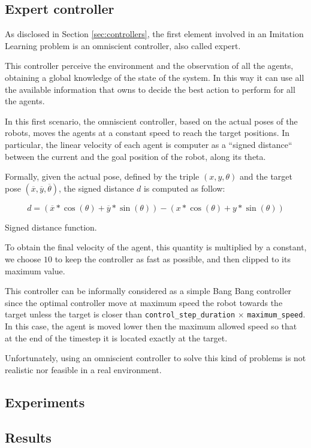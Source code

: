\subsection{Expert controller}
\label{subsec:omniscient}

As disclosed in Section \ref{sec:controllers}, the first element involved in an 
Imitation Learning problem is an omniscient controller, also called expert.

This controller perceive the environment and the observation of all the agents, 
obtaining a global knowledge of the state of the system. In this way it can use all 
the available information that owns to decide the best action to perform for all 
the agents. 

In this first scenario, the omniscient controller, based on the actual poses of the 
robots, moves the agents at a constant speed to reach the target positions. In 
particular, the linear velocity of each agent is computer as a ``signed distance`` 
between the current and the goal position of the robot, along its theta. 

Formally, given the actual pose, defined by the triple $(x, y, \theta)$ and the 
target pose $(\overline x, \overline y, \overline \theta)$, the signed distance $d$ 
is computed as follow:

\begin{Equation}[!htb]
	\centering
	\begin{equation}
	d = \left(\overline x * \cos (\theta) + \overline y * \sin (\theta)\right) -
	\left( x * \cos (\theta) + y * \sin (\theta)\right)
	\end{equation}
	\caption[Signed distance.]{Signed distance function.}
	\label{eq:signeddist}
\end{Equation}

To obtain the final velocity of the agent, this quantity is multiplied by a constant, 
we choose $10$ to keep the controller as fast as possible, and then clipped to its 
maximum value.

This controller can be informally considered as a simple Bang Bang controller 
since the optimal controller move at maximum speed the robot towards the target 
unless the target is closer than %
\texttt{control\_step\_duration} $\times$ \texttt{maximum\_speed}. In this case, 
the agent is moved lower then the maximum allowed speed so that at the end of 
the timestep it is located exactly at the target.

Unfortunately, using an omniscient controller to solve this kind of problems is not 
realistic nor feasible in a real environment.

\subsection{Experiments}
\label{subsec:ex1}

\subsection{Results}
\label{subsec:results1}

